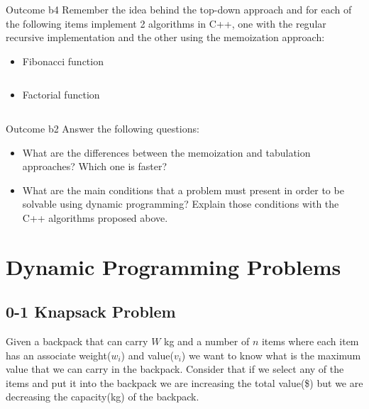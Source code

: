 \begin{problem}{Outcome b}{4}
    Remember the idea behind the top-down approach and 
    for each of the following items implement 2 algorithms in C++, 
    one with the regular recursive implementation and the other using the memoization approach:

    \begin{itemize}
        \item Fibonacci function
            \inputminted[fontsize=\small,breaklines]{cpp}{answers/problem1/problem1-1.cpp}
        \item Factorial function
            \inputminted[fontsize=\small,breaklines]{cpp}{answers/problem1/problem1-2.cpp}
    \end{itemize}
\end{problem}

\begin{problem}{Outcome b}{2}
    Answer the following questions:
    \begin{itemize}
        \item What are the differences between the memoization and tabulation approaches? Which one is faster?
        \item What are the main conditions that a problem must present in order to be solvable using dynamic programming? 
            Explain those conditions with the C++ algorithms proposed above.
    \end{itemize}

    \begin{center}
        
    \end{center}
\end{problem}

\section{Dynamic Programming Problems}

\subsection{0-1 Knapsack Problem}

Given a backpack that can carry $W$ kg and a number of $n$ items where each item has an associate weight($w_{i}$) and value($v_{i}$) we want to know what is the maximum value that we can carry in the backpack. \newline\newline
Consider that if we select any of the items and put it into the backpack we are increasing the total value(\$) but we are decreasing the capacity(kg) of the backpack.

